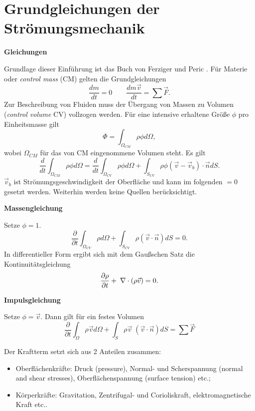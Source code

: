 \section{Grundgleichungen der Strömungsmechanik}

{\bf Gleichungen} 

Grundlage dieser Einführung ist das Buch von Ferziger und Peric
\cite{cfd}. Für Materie oder {\it control mass} (CM) gelten die
Grundgleichungen
\begin{equation}
\frac{dm}{dt} = 0 \qquad \frac{dm \vec{v}}{dt} = \sum \vec{F}.
\end{equation}
Zur Beschreibung von Fluiden muss der Übergang von Massen zu Volumen
({\it control volume} CV) vollzogen werden.
Für eine intensive erhaltene Größe $\phi$ pro Einheitsmasse gilt
\begin{equation}
\Phi = \int_{\Omega_{CM}} \rho \phi d \Omega,
\end{equation} 
wobei $\Omega_{CM}$ für das von CM eingenommene Volumen steht. Es gilt
\begin{equation}
\frac{d}{dt} \int_{\Omega_{CM}} \rho \phi d \Omega 
=
\frac{d}{dt} \int_{\Omega_{CV}} \rho \phi d \Omega 
+
\int_{S_{CV}} \rho \phi (\vec{v}-\vec{v}_b)\cdot \vec{n} d S.\label{eq:cm_cv}
\end{equation} 
$\vec{v}_b$ ist Strömungsgeschwindigkeit der Oberfläche und kann im folgenden
$= 0$ gesetzt werden. Weiterhin werden keine Quellen berücksichtigt.

{\bf Massengleichung}

Setze $\phi=1$.
\begin{equation}
\frac{\partial}{\partial t} \int_{\Omega_{CV}} \rho d \Omega
+
\int_{S_{CV}} \rho (\vec{v} \cdot \vec{n}) d S
= 0.
\end{equation}
In differentieller Form ergibt sich mit dem Gaußschen Satz die
Kontinuitätsgleichung
\begin{equation}
\frac{\partial \rho }{\partial t} + \;\nabla \cdot (\rho \vec{v}) =
0.\label{eq:masse_diff}
\end{equation}


{\bf Impulsgleichung}

Setze $\phi=\vec{v}$. Dann gilt für ein festes Volumen
\begin{equation}
\frac{\partial}{\partial t} \int_{\Omega} \rho \vec{v} d \Omega +
\int_{S} \rho \vec{v} \; (\vec{v}\cdot \vec{n}) d S = \sum \vec{F}
\end{equation} 

Der Kraftterm setzt sich aus 2 Anteilen zusammen:
\begin{itemize}
\item Oberflächenkräfte: Druck (pressure), Normal- und Scherspannung (normal
  and shear stresses), Oberflächenspannung (surface tension) etc.;
\item Körperkräfte: Gravitation, Zentrifugal- und Corioliskraft,
  elektromagnetische Kraft etc..
\end{itemize}

